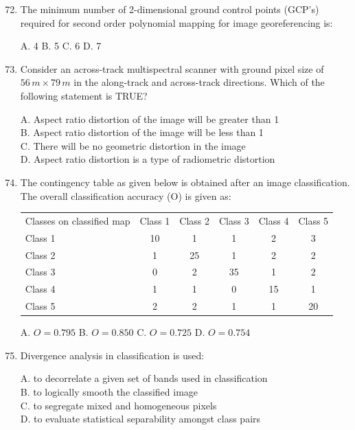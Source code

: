 \documentclass[journal,12pt,onecolumn]{IEEEtran}
\begin{document}
\begin{enumerate}
    \setcounter{enumi}{71}
    \item The minimum number of 2-dimensional ground control points (GCP’s) required for second order polynomial mapping for image georeferencing is:

    A. 4 \quad
    B. 5 \quad
    C. 6 \quad
    D. 7

    \item Consider an across-track multispectral scanner with ground pixel size of $56\,m \times 79\,m$ in the along-track and across-track directions. Which of the following statement is TRUE?

    A. Aspect ratio distortion of the image will be greater than 1 \\
    B. Aspect ratio distortion of the image will be less than 1 \\
    C. There will be no geometric distortion in the image \\
    D. Aspect ratio distortion is a type of radiometric distortion

    \item The contingency table as given below is obtained after an image classification. The overall classification accuracy (O) is given as:

\begin{center}
\begin{tabular}{lccccc}
Classes on classified map & Class 1 & Class 2 & Class 3 & Class 4 & Class 5 \\
Class 1 & 10 & 1 & 1 & 2 & 3 \\
Class 2 & 1 & 25 & 1 & 2 & 2 \\
Class 3 & 0 & 2 & 35 & 1 & 2 \\
Class 4 & 1 & 1 & 0 & 15 & 1 \\
Class 5 & 2 & 2 & 1 & 1 & 20 \\
\end{tabular}
\end{center}

    A. $O = 0.795$ \quad
    B. $O = 0.850$ \quad
    C. $O = 0.725$ \quad
    D. $O = 0.754$

    \item Divergence analysis in classification is used:

    A. to decorrelate a given set of bands used in classification \\
    B. to logically smooth the classified image \\
    C. to segregate mixed and homogeneous pixels \\
    D. to evaluate statistical separability amongst class pairs


\end{enumerate}
\end{document}
